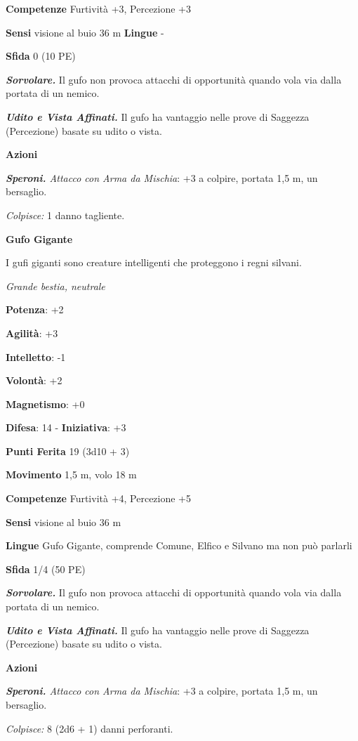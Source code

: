 \begin{multicols}{2}
\textbf{Competenze} Furtività +3, Percezione +3

\textbf{Sensi} visione al buio 36 m
\textbf{Lingue} -

\textbf{Sfida} 0 (10 PE)

\emph{\textbf{Sorvolare.}} Il gufo non provoca attacchi di opportunità
quando vola via dalla portata di un nemico.

\emph{\textbf{Udito e Vista Affinati.}} Il gufo ha vantaggio nelle prove
di Saggezza (Percezione) basate su udito o vista.

\textbf{Azioni}

\emph{\textbf{Speroni.} Attacco con Arma da Mischia}: +3 a colpire,
portata 1,5 m, un bersaglio.

\emph{Colpisce:} 1 danno tagliente.

\textbf{Gufo Gigante}

I gufi giganti sono creature intelligenti che proteggono i regni
silvani.

\emph{Grande bestia, neutrale}

\textbf{Potenza}: +2

\textbf{Agilità}: +3

\textbf{Intelletto}: -1

\textbf{Volontà}: +2

\textbf{Magnetismo}: +0

\textbf{Difesa}: 14 - \textbf{Iniziativa}: +3

\textbf{Punti Ferita} 19 (3d10 + 3)

\textbf{Movimento} 1,5 m, volo 18 m

\textbf{Competenze} Furtività +4, Percezione +5

\textbf{Sensi} visione al buio 36 m

\textbf{Lingue} Gufo Gigante, comprende Comune, Elfico e Silvano ma non
può parlarli

\textbf{Sfida} 1/4 (50 PE)

\emph{\textbf{Sorvolare.}} Il gufo non provoca attacchi di opportunità
quando vola via dalla portata di un nemico.

\emph{\textbf{Udito e Vista Affinati.}} Il gufo ha vantaggio nelle prove
di Saggezza (Percezione) basate su udito o vista.

\textbf{Azioni}

\emph{\textbf{Speroni.} Attacco con Arma da Mischia}: +3 a colpire,
portata 1,5 m, un bersaglio.

\emph{Colpisce:} 8 (2d6 + 1) danni perforanti.


\end{multicols}
